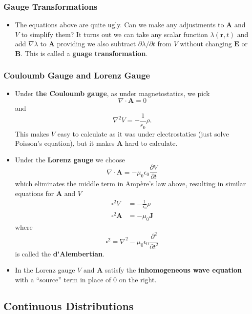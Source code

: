 \documentclass{article}
\renewcommand{\vec}[1]{\boldsymbol{\mathbf{#1}}}
\begin{document}
\subsubsection{Gauge Transformations}

\begin{itemize}
  \item The equations above are quite ugly. Can we make any adjustments to $\vec{A}$ and $V$ to simplify them? It turns out we can take any scalar function $\lambda(\vec{r}, t)$ and add $\nabla \lambda$ to $\vec{A}$ providing we also subtract $\partial \lambda / \partial t$ from $V$ without changing $\vec{E}$ or $\vec{B}$. This is called a \textbf{guage transformation}.
\end{itemize}

\subsubsection{Couloumb Gauge and Lorenz Gauge}

\begin{itemize}
  \item Under \textbf{the Couloumb gauge}, as under magnetostatics, we pick \[\nabla \cdot \vec{A} = 0\] and \[\nabla^2 V = -\frac{1}{\epsilon_0} \rho.\] This makes $V$ easy to calculate as it was under electrostatics (just solve Poisson's equation), but it makes $\vec{A}$ hard to calculate.

  \item Under the \textbf{Lorenz gauge} we choose \[\nabla \cdot \vec{A} = -\mu_0 \epsilon_0 \frac{\partial V}{\partial t}\] which eliminates the middle term in Ampère's law above, resulting in similar equations for $\vec{A}$ and $V$ \begin{align*}
          \square^2 V       & = -\frac{1}{\epsilon_0} \rho \\
          \square^2 \vec{A} & = -\mu_0 \vec{J}
        \end{align*} where \[\square^2 = \nabla^2 - \mu_0 \epsilon_0 \frac{\partial^2}{\partial t^2}\] is called the \textbf{d'Alembertian}.

  \item In the Lorenz gauge $V$ and $\vec{A}$ satisfy the \textbf{inhomogeneous wave equation} with a ``source'' term in place of $0$ on the right.
\end{itemize}

\subsection{Continuous Distributions}
\end{document}
